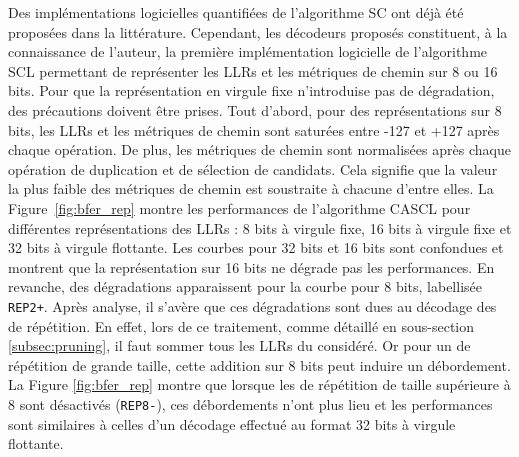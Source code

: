 Des implémentations logicielles quantifiées de l'algorithme SC ont déjà été proposées \cite{giard_low-latency_2016} dans la littérature.
 Cependant, les décodeurs proposés constituent, à la connaissance de l'auteur, la première implémentation logicielle de l'algorithme SCL permettant de représenter les LLRs et les métriques de chemin sur 8 ou 16 bits.
Pour que la représentation en virgule fixe n'introduise pas de dégradation, des précautions doivent être prises.
Tout d'abord, pour des représentations sur 8 bits, les LLRs et les métriques de chemin sont saturées entre -127 et +127 après chaque opération.
De plus, les métriques de chemin sont normalisées après chaque opération de duplication et de sélection de candidats. Cela signifie que la valeur la plus faible des métriques de chemin est soustraite à chacune d'entre elles.
La Figure~\ref{fig:bfer_rep} montre les performances de l'algorithme CASCL pour différentes représentations des LLRs : 8 bits à virgule fixe, 16 bits à virgule fixe et 32 bits à virgule flottante.
Les courbes pour 32 bits et 16 bits sont confondues et montrent que la représentation sur 16 bits ne dégrade pas les performances. En revanche, des dégradations apparaissent pour la courbe pour 8 bits, labellisée \texttt{REP2+}.
Après analyse, il s'avère que ces dégradations sont dues au décodage des \noeuds de répétition.
En effet, lors de ce traitement, comme détaillé en sous-section \ref{subsec:pruning}, il faut sommer tous les LLRs du \noeud considéré.
Or pour un \noeud de répétition de grande taille, cette addition sur 8 bits peut induire un débordement.
La Figure \ref{fig:bfer_rep} montre que lorsque les \noeuds de répétition de taille supérieure à 8 sont désactivés (\texttt{REP8-}), ces débordements n'ont plus lieu et les performances sont similaires à celles d'un décodage effectué au format 32 bits à virgule flottante.

